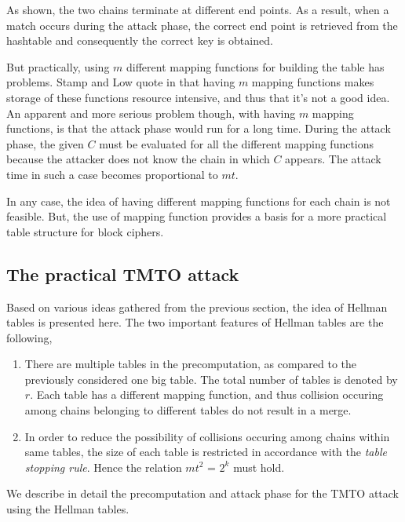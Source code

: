 As shown, the two chains terminate at different end points. As a result, when a match occurs during the attack phase, the correct end point is retrieved from the hashtable and consequently the correct key is obtained. 

But practically, using $m$ different mapping functions for building the table has problems. Stamp and Low quote in \cite{stamp2007acb} that having $m$ mapping functions makes storage of these functions resource intensive, and thus that it's not a good idea. An apparent and more serious problem though, with having $m$ mapping functions, is that the attack phase would run for a long time. During the attack phase, the given $C$ must be evaluated for all the different mapping functions because the attacker does not know the chain in which $C$ appears. The attack time in such a case becomes proportional to $mt$. 

In any case, the idea of having different mapping functions for each chain is not feasible. But, the use of mapping function provides a basis for a more practical table structure for block ciphers. 

\subsection{The practical TMTO attack}

Based on various ideas gathered from the previous section, the idea of Hellman tables \cite{hellman1980ctm} is presented here. The two important features of Hellman tables are the following,

\begin{enumerate}
\item There are multiple tables in the precomputation, as compared to the previously considered one big table. The total number of tables is denoted by $r$. Each table has a different mapping function, and thus collision occuring among chains belonging to different tables do not result in a merge.

\item In order to reduce the possibility of collisions occuring among chains within same tables, the size of each table is restricted in accordance with the \emph{table stopping rule}. Hence the relation $mt^2$ = $2^k$ must hold.
\end{enumerate}

We describe in detail the precomputation and attack phase for the TMTO attack using the Hellman tables.\\

